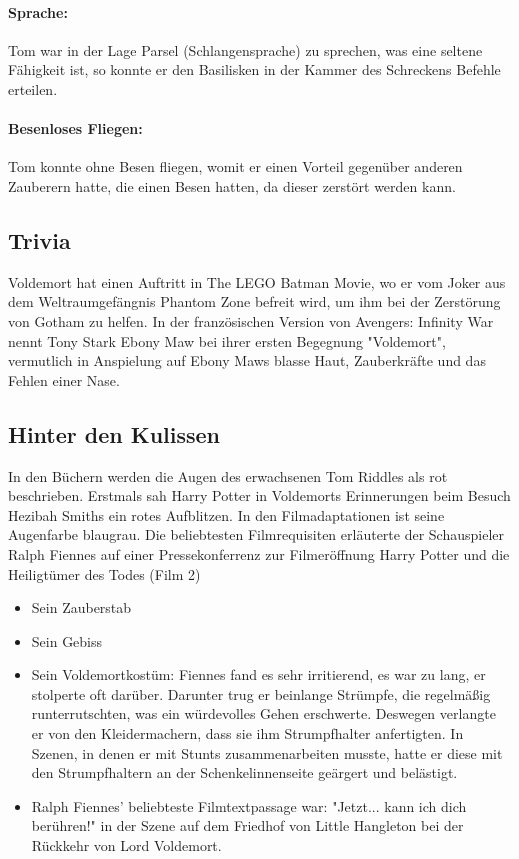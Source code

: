 \documentclass[a4paper, 10pt]{article}
\begin{document}
\paragraph{Sprache:}  
Tom war in der Lage Parsel (Schlangensprache) zu sprechen, was eine seltene Fähigkeit ist, so konnte er den Basilisken in der Kammer des Schreckens Befehle erteilen.
\paragraph{Besenloses Fliegen:} 
Tom konnte ohne Besen fliegen, womit er einen Vorteil gegenüber anderen Zauberern hatte, die einen Besen hatten, da dieser zerstört werden kann.

\subsection*{\Large Trivia}
Voldemort hat einen Auftritt in The LEGO Batman Movie, wo er vom Joker aus dem Weltraumgefängnis Phantom Zone befreit wird, um ihm bei der Zerstörung von Gotham zu helfen.
In der französischen Version von Avengers: Infinity War nennt Tony Stark Ebony Maw bei ihrer ersten Begegnung "Voldemort", vermutlich in Anspielung auf Ebony Maws blasse Haut, Zauberkräfte und das Fehlen einer Nase.

\subsection*{\Large Hinter den Kulissen}
In den Büchern werden die Augen des erwachsenen Tom Riddles als rot beschrieben. Erstmals sah Harry Potter in Voldemorts Erinnerungen beim Besuch Hezibah Smiths ein rotes Aufblitzen. In den Filmadaptationen ist seine Augenfarbe blaugrau.
\vspace{10pt}
\newline
Die beliebtesten Filmrequisiten erläuterte der Schauspieler Ralph Fiennes auf einer Pressekonferrenz zur Filmeröffnung Harry Potter und die Heiligtümer des Todes (Film 2)
\begin{itemize}
    \item Sein Zauberstab
    \item Sein Gebiss
    \item Sein Voldemortkostüm: Fiennes fand es sehr irritierend, es war zu lang, er stolperte oft darüber. Darunter trug er beinlange Strümpfe, die regelmäßig runterrutschten, was ein würdevolles Gehen erschwerte. Deswegen verlangte er von den Kleidermachern, dass sie ihm Strumpfhalter anfertigten. In Szenen, in denen er mit Stunts zusammenarbeiten musste, hatte er diese mit den Strumpfhaltern an der Schenkelinnenseite geärgert und belästigt.
    \item Ralph Fiennes' beliebteste Filmtextpassage war: "Jetzt... kann ich dich berühren!" in der Szene auf dem Friedhof von Little Hangleton bei der Rückkehr von Lord Voldemort.
\end{itemize}
\end{document}
